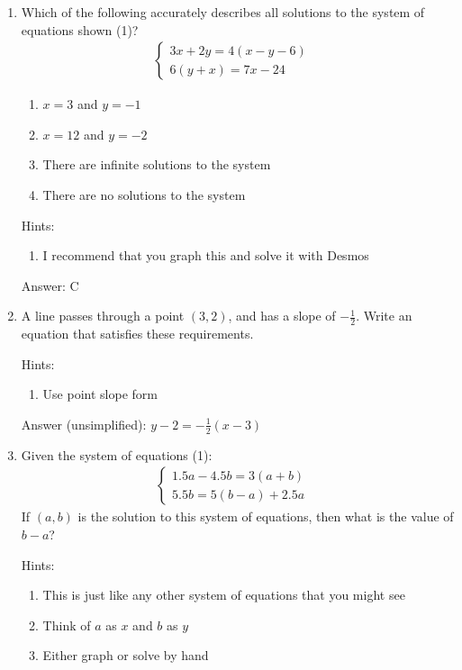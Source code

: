 \documentclass{article}
\begin{document}
\begin{enumerate}
	\item{Which of the following accurately describes all solutions to the system of equations shown (1)?
	      \[
		      \begin{array}{l}
			      \begin{cases}
				      3x+2y=4(x-y-6) & \\
				      6(y+x)=7x-24
			      \end{cases}
		      \end{array}
	      \]

	      \begin{enumerate}
		      \item{$x=3$ and $y=-1$}
		      \item{$x=12$ and $y=-2$}
		      \item{There are infinite solutions to the system}
		      \item{There are no solutions to the system}
	      \end{enumerate}

	      Hints:
	      \begin{enumerate}
		      \item{I recommend that you graph this and solve it with Desmos}
	      \end{enumerate}

	      Answer: C
	      }
	\item{A line passes through a point $(3,2)$, and has a slope of $-\frac{1}{2}$. Write an equation that satisfies these requirements.

	      Hints:
	      \begin{enumerate}
		      \item{Use point slope form}
	      \end{enumerate}

	      Answer (unsimplified): \(y-2=-\frac{1}{2}(x-3)\)
	      }
	\item{Given the system of equations (1):
	      \[
		      \begin{array}{l}
			      \begin{cases}
				      1.5a-4.5b=3(a+b) & \\
				      5.5b=5(b-a)+2.5a
			      \end{cases}
		      \end{array}
	      \]
	      If $(a,b)$ is the solution to this system of equations, then what is the value of $b-a$?

	      Hints:
	      \begin{enumerate}
		      \item{This is just like any other system of equations that you might see}
		      \item{Think of $a$ as $x$ and $b$ as $y$}
		      \item{Either graph or solve by hand}
	      \end{enumerate}

}
\end{enumerate}
\end{document}
